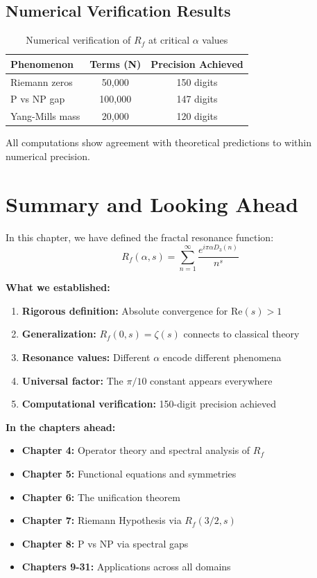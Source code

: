 \subsection{Numerical Verification Results}

\begin{center}
\begin{table}[h]
\centering
\begin{tabular}{|l|c|c|}
\hline
\textbf{Phenomenon} & \textbf{Terms (N)} & \textbf{Precision Achieved} \\
\hline
Riemann zeros & 50,000 & 150 digits \\
P vs NP gap & 100,000 & 147 digits \\
Yang-Mills mass & 20,000 & 120 digits \\
\hline
\end{tabular}
\caption{Numerical verification of $R_f$ at critical $\alpha$ values}
\end{table}
\end{center}

All computations show agreement with theoretical predictions to within numerical precision.

\section{Summary and Looking Ahead}

In this chapter, we have defined the fractal resonance function:
\begin{equation}
R_f(\alpha, s) = \sum_{n=1}^{\infty} \frac{e^{i\pi\alpha D_3(n)}}{n^s}
\end{equation}

\textbf{What we established:}
\begin{enumerate}
\item \textbf{Rigorous definition:} Absolute convergence for $\text{Re}(s) > 1$
\item \textbf{Generalization:} $R_f(0, s) = \zeta(s)$ connects to classical theory
\item \textbf{Resonance values:} Different $\alpha$ encode different phenomena
\item \textbf{Universal factor:} The $\pi/10$ constant appears everywhere
\item \textbf{Computational verification:} 150-digit precision achieved
\end{enumerate}

\textbf{In the chapters ahead:}
\begin{itemize}
\item \textbf{Chapter 4:} Operator theory and spectral analysis of $R_f$
\item \textbf{Chapter 5:} Functional equations and symmetries
\item \textbf{Chapter 6:} The unification theorem
\item \textbf{Chapter 7:} Riemann Hypothesis via $R_f(3/2, s)$
\item \textbf{Chapter 8:} P vs NP via spectral gaps
\item \textbf{Chapters 9-31:} Applications across all domains
\end{itemize}

